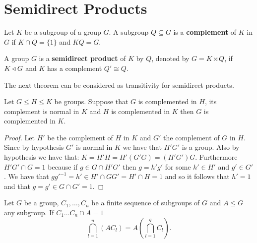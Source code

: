 \section{Semidirect Products}

\begin{definition}
    Let $K$ be a subgroup of a group $G$. A subgroup $Q \subseteq G$ is a \textbf{complement} of $K$ in $G$ if $K \cap Q = \{1\}$ and $KQ = G$.
\end{definition}

\begin{definition}
    A group $G$ is a \textbf{semidirect product} of $K$ by $Q$, denoted by $G = K \rtimes Q$, if $K \triangleleft G$ and $K$ has a complement $Q' \cong Q$.

\end{definition}

The next theorem can be considered as transitivity for semidirect products.

\begin{theorem}
\label{smdptrans}
Let $G \le H \le K$ be groups. Suppose that $G$ is complemented in $H$, its complement is normal in $K$ and $H$ is complemented in $K$ then $G$ is complemented in $K$.
\end{theorem}

\begin{proof}
    \label{S1:SPE}
    Let $H'$ be the complement of $H$ in $K$ and $G'$ the complement of $G$ in $H$. Since by hypothesis $G'$ is normal in $K$ we have that $H'G'$ is a group. Also by hypothesis we have that:
    $K = H'H =H'(G'G) = (H'G')G$.
    Furthermore $H'G' \cap G = 1$ because if $g \in G \cap H'G'$ then $g = h'g'$ for some $h' \in H'$ and $g' \in G'$. We have that $gg'^{-1} = h' \in H' \cap GG' = H' \cap H = 1$ and so it follows that $h' = 1$ and that $g = g' \in G \cap G' = 1$.
\end{proof}

\begin{theorem}
    Let $G$ be a group, $C_1, \ldots , C_n$ be a  finite sequence of subgroups of $G$ and $A \le G$ any subgroup. If $C_1\ldots C_n \cap A = 1$
    $$
    \bigcap_{l = 1}^{n}(AC_l) = A(\bigcap_{l = 1}^{q}C_l).
    $$
\end{theorem}


